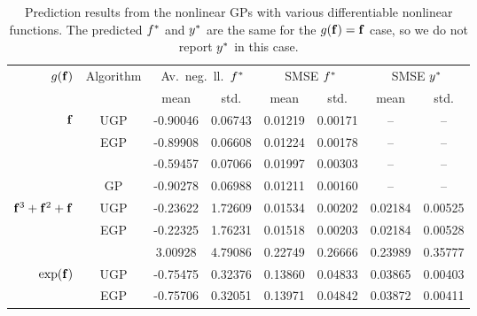 \documentclass{article} %
\begin{document}
\begin{table}[tb]
    \centering
    \small
    \caption[]{Prediction results from the nonlinear GPs with various 
        differentiable nonlinear functions. The predicted $f^{*}$ and 
        $y^{*}$ are the same for the $g\!\left({{\mathbf{f}}}\right) = \mathbf{f}$ case, so
        we do not report $y^{*}$ in this case.}
    \begin{tabular}{r|c| c c c c c c}
        \multirow{2}{*}{$g\!\left({{\mathbf{f}}}\right)$} & \multirow{2}{*}{Algorithm} & 
            \multicolumn{2}{c}{Av.\ neg.\ ll.\ $f^{*}$} &
            \multicolumn{2}{c}{SMSE $f^{*}$} &
            \multicolumn{2}{c}{SMSE $y^{*}$} \\
        & & mean & std. & mean & std. & mean & std.\\
        \toprule
        $\mathbf{f}$ 
& UGP & -0.90046 & 0.06743 & 0.01219 & 0.00171 & -- & -- \\
& EGP & -0.89908 & 0.06608 & 0.01224 & 0.00178 & -- & -- \\
& \cite{Opper2009} & -0.59457 & 0.07066 & 0.01997 & 0.00303 & -- & --\\
& GP & -0.90278 & 0.06988 & 0.01211 & 0.00160 & -- & -- \\
        \midrule
        $\mathbf{f}^3 + \mathbf{f}^2 + \mathbf{f}$ 
& UGP & -0.23622 & 1.72609 & 0.01534 & 0.00202 & 0.02184 & 0.00525 \\
& EGP & -0.22325 & 1.76231 & 0.01518 & 0.00203 & 0.02184 & 0.00528 \\
& \cite{Opper2009} & 3.00928 & 4.79086 & 0.22749 & 0.26666 & 0.23989 & 0.35777 \\
        \midrule
        $\exp\!\left({\mathbf{f}}\right)$ 
& UGP & -0.75475 & 0.32376 & 0.13860 & 0.04833 & 0.03865 & 0.00403 \\
& EGP & -0.75706 & 0.32051 & 0.13971 & 0.04842 & 0.03872 & 0.00411 \\

\end{tabular}
\end{table}
\end{document}
